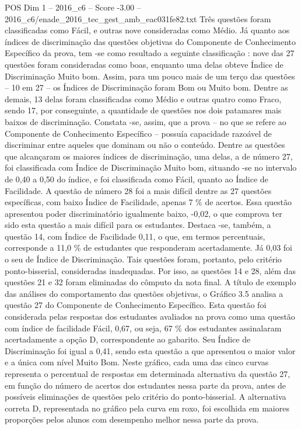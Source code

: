 \begin{textsample}{POS Dim 1 – 2016\_c6 – Score -3.00 – 2016\_c6/enade\_2016\_tec\_gest\_amb\_eac031fe82.txt}
Três questões foram classificadas como Fácil, e outras nove consideradas como Médio.
Já quanto aos índices de discriminação das questões objetivas do Componente de Conhecimento Específico da prova, tem -se como resultado a seguinte classificação : nove das 27 questões foram consideradas como boas, enquanto uma delas obteve Índice de Discriminação Muito bom.
Assim, para um pouco mais de um terço das questões – 10 em 27 – os Índices de Discriminação foram Bom ou Muito bom.
Dentre as demais, 13 delas foram classificadas como Médio e outras quatro como Fraco, sendo 17, por conseguinte, a quantidade de questões nos dois patamares mais baixos de discriminação.
Constata -se, assim, que a prova – no que se refere ao Componente de Conhecimento Específico – possuía capacidade razoável de discriminar entre aqueles que dominam ou não o conteúdo.
Dentre as questões que alcançaram os maiores índices de discriminação, uma delas, a de número 27, foi classificada com Índice de Discriminação Muito bom, situando -se no intervalo de 0,40 a 0,50 do índice, e foi classificada como Fácil, quanto ao Índice de Facilidade.
A questão de número 28 foi a mais difícil dentre as 27 questões específicas, com baixo Índice de Facilidade, apenas 7 \% de acertos.
Essa questão apresentou poder discriminatório igualmente baixo, -0,02, o que comprova ter sido esta questão a mais difícil para os estudantes.
Destaca -se, também, a questão 14, com Índice de Facilidade 0,11, o que, em termos percentuais, corresponde a 11,0 \% de estudantes que responderam acertadamente.
Já 0,03 foi o seu de Índice de Discriminação.
Tais questões foram, portanto, pelo critério ponto-bisserial, consideradas inadequadas.
Por isso, as questões 14 e 28, além das questões 21 e 32 foram eliminadas do cômputo da nota final.
A título de exemplo das análises do comportamento das questões objetivas, o Gráfico 3.5 analisa a questão 27 do Componente de Conhecimento Específico.
Esta questão foi considerada pelas respostas dos estudantes avaliados na prova como uma questão com índice de facilidade Fácil, 0,67, ou seja, 67 \% dos estudantes assinalaram acertadamente a opção D, correspondente ao gabarito.
Seu Índice de Discriminação foi igual a 0,41, sendo esta questão a que apresentou o maior valor e a única com nível Muito Bom.
Neste gráfico, cada uma das cinco curvas representa o percentual de respostas em determinada alternativa da questão 27, em função do número de acertos dos estudantes nessa parte da prova, antes de possíveis eliminações de questões pelo critério do ponto-bisserial.
A alternativa correta D, representada no gráfico pela curva em roxo, foi escolhida em maiores proporções pelos alunos com desempenho melhor nessa parte da prova.

\end{textsample}
